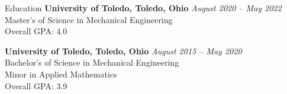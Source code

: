 \documentclass{bilal}
\begin{document}
\begin{rSection}{Education}
{\bf University of Toledo, Toledo, Ohio} \hfill {\em August 2020 -- May 2022} \\
Master's of Science in Mechanical Engineering \\
Overall GPA: 4.0

{\bf University of Toledo, Toledo, Ohio} \hfill {\em August 2015 -- May 2020} \\
Bachelor's of Science in Mechanical Engineering \\
Minor in Applied Mathematics \smallskip \\
Overall GPA: 3.9
\end{rSection}
\end{document}
